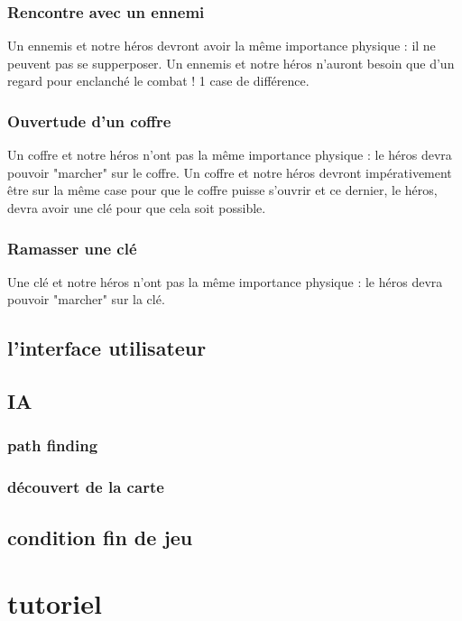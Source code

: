 \documentclass[a4paper 12pts]{article}
\begin{document}
\subsubsection {Rencontre avec un ennemi} 
Un ennemis et notre héros devront avoir la même importance physique : il ne peuvent pas se supperposer.
Un ennemis et notre héros n'auront besoin que d'un regard pour enclanché le combat ! 1 case de différence.


\subsubsection {Ouvertude d'un coffre}
Un coffre et notre héros n'ont pas la même importance physique : le héros devra pouvoir "marcher" sur le coffre.
Un coffre et notre héros devront impérativement être sur la même case pour que le coffre puisse s'ouvrir et ce dernier, 
le héros, devra avoir une clé pour que cela soit possible.


\subsubsection {Ramasser une clé}
Une clé et notre héros n'ont pas la même importance physique : le héros devra pouvoir "marcher" sur la clé.

 
\subsection{l'interface utilisateur}

\subsection{IA}

\subsubsection{path finding}

\subsubsection{découvert de la carte}

\subsection{condition fin de jeu}





\section{tutoriel}
\end{document}
